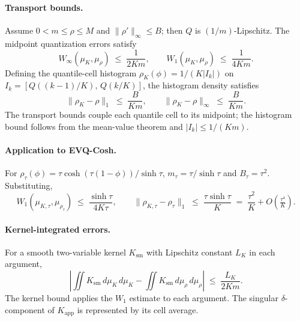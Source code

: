 \paragraph{Transport bounds.} Assume $0<m\le\rho\le M$ and $\|\rho'\|_\infty\le B$; then $Q$ is $(1/m)$-Lipschitz. The midpoint quantization errors satisfy
\begin{equation}
W_\infty(\mu_K,\mu_\rho) \;\le\; \frac{1}{2Km}, \qquad W_1(\mu_K,\mu_\rho) \;\le\; \frac{1}{4Km}.
\label{eq:wasserstein-bound}
\end{equation}
Defining the quantile-cell histogram $\rho_K(\phi){=}1/(K|I_k|)$ on $I_k{=}[Q((k{-}1)/K),\,Q(k/K)]$, the histogram density satisfies
\begin{equation}
\|\rho_K-\rho\|_1 \;\le\; \frac{B}{Km}, \qquad \|\rho_K-\rho\|_\infty \;\le\; \frac{B}{Km}.
\label{eq:density-bound}
\end{equation}
The transport bounds couple each quantile cell to its midpoint; the histogram
bound follows from the mean-value theorem and $|I_k|\le 1/(Km)$.

\paragraph{Application to EVQ-Cosh.} For $\rho_\tau(\phi)=\tau\cosh(\tau(1{-}\phi))/\sinh\tau$, $m_\tau=\tau/\sinh\tau$ and $B_\tau=\tau^2$. Substituting,
\begin{equation}
W_1(\mu_{K,\tau},\mu_{\rho_\tau}) \;\le\; \frac{\sinh\tau}{4K\tau}, \qquad \|\rho_{K,\tau}-\rho_\tau\|_1 \;\le\; \frac{\tau\sinh\tau}{K} \;=\; \frac{\tau^2}{K}+O\!\left(\tfrac{\tau^4}{K}\right).
\label{eq:evq-discrete-bound}
\end{equation}

\paragraph{Kernel-integrated errors.} For a smooth two-variable kernel $K_{\mathrm{sm}}$ with Lipschitz constant $L_K$ in each argument,
\begin{equation}
\left|\iint K_{\mathrm{sm}}\,d\mu_K\,d\mu_K - \iint K_{\mathrm{sm}}\,d\mu_\rho\,d\mu_\rho\right| \;\le\; \frac{L_K}{2Km}.
\label{eq:kernel-bound}
\end{equation}
The kernel bound applies the $W_1$ estimate to each argument. The singular
$\delta$-component of $K_{\mathrm{app}}$ is represented by its cell average.

